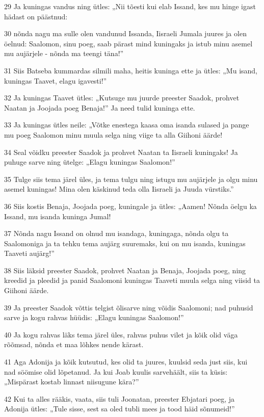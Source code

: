 \par 29 Ja kuningas vandus ning ütles: „Nii tõesti kui elab Issand, kes mu hinge igast hädast on päästnud:
\par 30 nõnda nagu ma sulle olen vandunud Issanda, Iisraeli Jumala juures ja olen öelnud: Saalomon, sinu poeg, saab pärast mind kuningaks ja istub minu asemel mu aujärjele - nõnda ma teengi täna!”
\par 31 Siis Batseba kummardas silmili maha, heitis kuninga ette ja ütles: „Mu isand, kuningas Taavet, elagu igavesti!”
\par 32 Ja kuningas Taavet ütles: „Kutsuge mu juurde preester Saadok, prohvet Naatan ja Joojada poeg Benaja!” Ja need tulid kuninga ette.
\par 33 Ja kuningas ütles neile: „Võtke enestega kaasa oma isanda sulased ja pange mu poeg Saalomon minu muula selga ning viige ta alla Giihoni äärde!
\par 34 Seal võidku preester Saadok ja prohvet Naatan ta Iisraeli kuningaks! Ja puhuge sarve ning ütelge: „Elagu kuningas Saalomon!”
\par 35 Tulge siis tema järel üles, ja tema tulgu ning istugu mu aujärjele ja olgu minu asemel kuningas! Mina olen käskinud teda olla Iisraeli ja Juuda vürstiks.”
\par 36 Siis kostis Benaja, Joojada poeg, kuningale ja ütles: „Aamen! Nõnda öelgu ka Issand, mu isanda kuninga Jumal!
\par 37 Nõnda nagu Issand on olnud mu isandaga, kuningaga, nõnda olgu ta Saalomoniga ja ta tehku tema aujärg suuremaks, kui on mu isanda, kuningas Taaveti aujärg!”
\par 38 Siis läksid preester Saadok, prohvet Naatan ja Benaja, Joojada poeg, ning kreedid ja pleedid ja panid Saalomoni kuningas Taaveti muula selga ning viisid ta Giihoni äärde.
\par 39 Ja preester Saadok võttis telgist õlisarve ning võidis Saalomoni; nad puhusid sarve ja kogu rahvas hüüdis: „Elagu kuningas Saalomon!”
\par 40 Ja kogu rahvas läks tema järel üles, rahvas puhus vilet ja kõik olid väga rõõmsad, nõnda et maa lõhkes nende kärast.
\par 41 Aga Adonija ja kõik kutsutud, kes olid ta juures, kuulsid seda just siis, kui nad söömise olid lõpetanud. Ja kui Joab kuulis sarvehäält, siis ta küsis: „Mispärast kostab linnast niisugune kära?”
\par 42 Kui ta alles rääkis, vaata, siis tuli Joonatan, preester Ebjatari poeg, ja Adonija ütles: „Tule sisse, sest sa oled tubli mees ja tood häid sõnumeid!”
